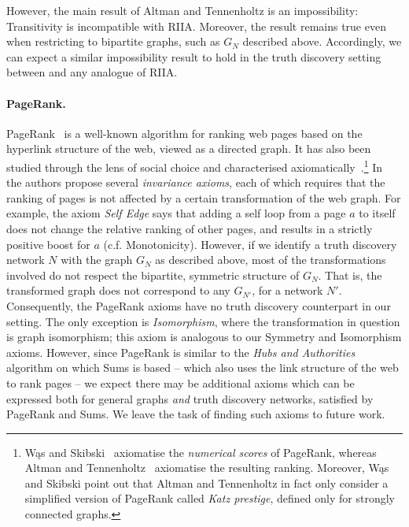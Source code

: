 However, the main result of Altman and Tennenholtz is an impossibility:
Transitivity is incompatible with RIIA. Moreover, the result remains true even
when restricting to bipartite graphs, such as $G_N$ described above.
Accordingly, we can expect a similar impossibility result to hold in the truth
discovery setting between \coherence{} and any analogue of RIIA.

\paragraph{PageRank.} PageRank~\cite{page_pagerank_1999} is a well-known
algorithm for ranking web pages based on the hyperlink structure of the web,
viewed as a directed graph. It has also been studied through the lens of social
choice and characterised
axiomatically~\cite{altman2005ranking,skibski_pagerank}.\footnote{
    Wąs and Skibski~\cite{skibski_pagerank} axiomatise the \emph{numerical
    scores} of PageRank, whereas Altman and
    Tennenholtz~\cite{altman2005ranking} axiomatise the resulting ranking.
    Moreover, Wąs and Skibski point out that Altman and Tennenholtz in fact
    only consider a simplified version of PageRank called \emph{Katz prestige},
    defined only for strongly connected graphs.
} In ~\cite{altman2005ranking} the authors propose several \emph{invariance
axioms}, each of which requires that the ranking of pages is not affected by a
certain transformation of the web graph. For example, the axiom \emph{Self
Edge} says that adding a self loop from a page $a$ to itself does not change the relative
ranking of other pages, and results in a strictly positive boost for $a$ (c.f.
Monotonicity). However, if we identify a truth discovery network $N$ with the
graph $G_N$ as described above, most of the transformations involved do not
respect the bipartite, symmetric structure of $G_N$. That is, the transformed
graph does not correspond to any $G_{N'}$, for a network $N'$. Consequently,
the PageRank axioms have no truth discovery counterpart in our
setting. The only exception is \emph{Isomorphism}, where the transformation
in question is graph isomorphism; this axiom is analogous to our Symmetry and
Isomorphism axioms. However, since PageRank is similar to the \emph{Hubs and
Authorities}~\cite{kleinberg1999} algorithm on which Sums is based -- which
also uses the link structure of the web to rank pages -- we expect there may be
additional axioms which can be expressed both for general graphs \emph{and}
truth discovery networks, satisfied by PageRank and Sums. We leave the task of
finding such axioms to future work.

